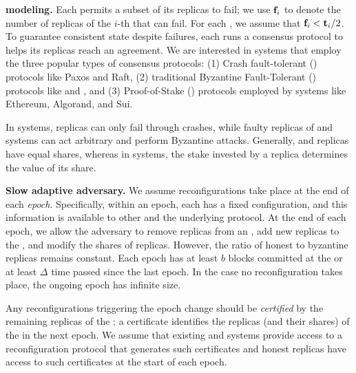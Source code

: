 {\bf \RSM{} modeling.}
Each \RSM{} permits a subset of its replicas to fail; 
we use $\textbf{f}_{i}$ to denote the number of replicas of the $i$-th \RSM{} that can fail.
For each \RSM{}, we assume that $\textbf{f}_{i} < \textbf{t}_{i}/2$.
To guarantee consistent state despite failures, 
each \RSM{} runs a consensus protocol to helps its replicas reach an agreement.
We are interested in systems that employ the three popular types of consensus protocols:
(1) Crash fault-tolerant (\CFT{}) protocols like Paxos and Raft,
(2) traditional Byzantine Fault-Tolerant (\BFT{}) protocols like \pbft{} and , and 
(3) Proof-of-Stake (\PoS{}) protocols employed by systems like Ethereum, Algorand, and Sui.

\Ped{}
In \CFT{} systems, replicas can only fail through crashes, while faulty replicas of \BFT{} and \PoS{} 
systems can act arbitrary and perform Byzantine attacks.
Generally, \CFT{} and \BFT{} replicas have equal shares, whereas
in \PoS{} systems, the stake invested by a replica determines the value of its share.


{\bf Slow adaptive adversary.}
We assume \RSM{} reconfigurations take place at the end of each {\em epoch}. 
Specifically, within an epoch, each \RSM{} has a fixed configuration, and this 
information is available to other  and the underlying protocol.
At the end of each epoch, we allow the adversary to remove replicas from an \RSM{}, 
add new replicas to the \RSM{}, and modify the shares of replicas. 
However, the ratio of honest to byzantine replicas remains constant.
Each epoch has at least $b$ blocks committed at the \RSM{} or 
at least $\Delta$ time passed since the last epoch.
In the case no reconfiguration takes place, the ongoing epoch has infinite size.

Any reconfigurations triggering the epoch change should be {\em certified} by the remaining replicas of the \RSM{}; 
a certificate identifies the replicas (and their shares) of the \RSM{} in the next epoch.
We assume that existing \BFT{} and \PoS{} systems provide access to 
a reconfiguration protocol that generates such certificates and honest replicas have access to 
such certificates at the start of each epoch.




